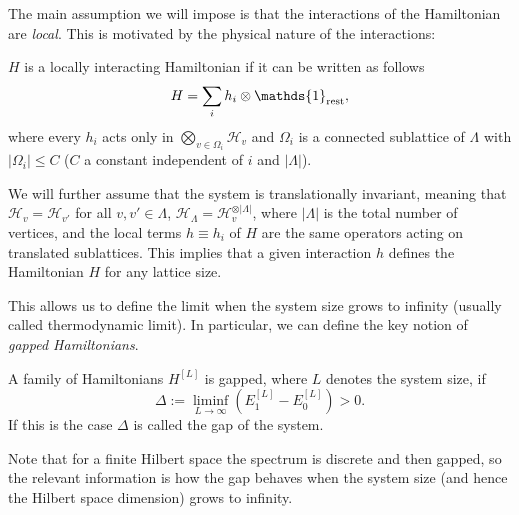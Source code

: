 \documentclass[smallextended]{svjour3}
\renewcommand{\1}{\mathbbm{1}}
\newcommand{\id}{\mathds{1}}
\begin{document}
The main assumption we will impose is that the interactions of the Hamiltonian are \emph{local}. This is motivated by the physical nature of the interactions:
\begin{definition}
    $H$ is a locally interacting Hamiltonian if it can be written as follows
    $$H=\sum_i h_i\otimes \id_{\rm rest},$$
    where every $h_i$ acts only in $\bigotimes_{v\in \Omega_i } \mathcal{H}_v$ and $\Omega_i$ is a connected sublattice of $\Lambda$ with $|\Omega_i|\le C$ ($C$ a constant independent of $i$ and $|\Lambda|$).
\end{definition}

We will further assume that the system is translationally invariant, meaning that $\mathcal{H}_v=\mathcal{H}_{v'}$ for all $v,v' \in \Lambda$, $\mathcal{H}_\Lambda= \mathcal{H}^{\otimes |\Lambda|}_v$, where $|\Lambda|$ is the total number of vertices, and the local terms $h\equiv h_i$ of $H$ are the same operators acting on translated sublattices. This implies that a given interaction $h$ defines the Hamiltonian $H$ for any lattice size.

This allows us to define the limit when the system size grows to infinity (usually called thermodynamic limit). In particular, we can define the key notion of {\it gapped Hamiltonians}.

\begin{definition}
    A family of Hamiltonians $H^{[L]}$ is gapped, where $L$ denotes the system size, if
    $$\Delta:=\liminf_{L\rightarrow \infty} \left(E_1^{[L]}-E_0^{[L]}\right)>0.$$
    If this is the case $\Delta$ is called the gap of the system.
\end{definition}
Note that for a finite Hilbert space the spectrum is discrete and then gapped, so the relevant information is how the gap behaves when the system size (and hence the Hilbert space dimension) grows to infinity.\\
\end{document}
